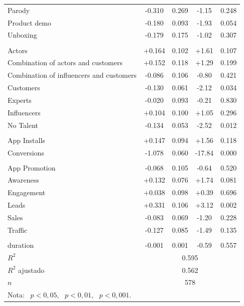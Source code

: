 \begin{longtable}{lcccc}
\quad Parody & -0.310 & 0.269 & -1.15 & 0.248 \\
\quad Product demo & -0.180 & 0.093 & -1.93 & 0.054 \\
\quad Unboxing & -0.179 & 0.175 & -1.02 & 0.307 \\
\addlinespace
\multicolumn{5}{l}{\textit{Talent Type}} \\
\quad Actors & +0.164 & 0.102 & +1.61 & 0.107 \\
\quad Combination of actors and customers & +0.152 & 0.118 & +1.29 & 0.199 \\
\quad Combination of influencers and customers & -0.086 & 0.106 & -0.80 & 0.421 \\
\quad Customers & -0.130\sym{*} & 0.061 & -2.12 & 0.034 \\
\quad Experts & -0.020 & 0.093 & -0.21 & 0.830 \\
\quad Influencers & +0.104 & 0.100 & +1.05 & 0.296 \\
\quad No Talent & -0.134\sym{*} & 0.053 & -2.52 & 0.012 \\
\addlinespace
\multicolumn{5}{l}{\textit{objective\_value}} \\
\quad App Installs & +0.147 & 0.094 & +1.56 & 0.118 \\
\quad Conversions & -1.078\sym{***} & 0.060 & -17.84 & 0.000 \\
\addlinespace
\multicolumn{5}{l}{\textit{campaign\_objective}} \\
\quad App Promotion & -0.068 & 0.105 & -0.64 & 0.520 \\
\quad Awareness & +0.132 & 0.076 & +1.74 & 0.081 \\
\quad Engagement & +0.038 & 0.098 & +0.39 & 0.696 \\
\quad Leads & +0.331\sym{**} & 0.106 & +3.12 & 0.002 \\
\quad Sales & -0.083 & 0.069 & -1.20 & 0.228 \\
\quad Traffic & -0.127 & 0.085 & -1.49 & 0.135 \\
\addlinespace
\multicolumn{5}{l}{\textit{duration}} \\
\quad duration & -0.001 & 0.001 & -0.59 & 0.557 \\
\addlinespace
\midrule
$R^2$ & \multicolumn{4}{c}{0.595} \\
$R^2$ ajustado & \multicolumn{4}{c}{0.562} \\
$n$ & \multicolumn{4}{c}{578} \\
\bottomrule
\multicolumn{5}{l}{\small Nota: \sym{*}~$p<0{,}05$, \sym{**}~$p<0{,}01$, \sym{***}~$p<0{,}001$.} \\
\end{longtable}
